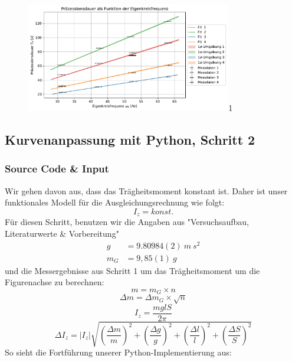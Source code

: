 \documentclass[a4paper,10pt]{article}
\begin{document}
\begin{figure}[htb]
  \centering
  \begin{annotate}{\includegraphics[width=0.8\textwidth]{213_Fig2.pdf}}{1}
  \end{annotate}
\caption{}
\label{fig:Fig2}
\end{figure}
\subsection{Kurvenanpassung mit Python, Schritt 2}
\subsubsection{Source Code \& Input}
Wir gehen davon aus, dass das Trägheitsmoment konstant ist.
Daher ist unser funktionales Modell für die Ausgleichungsrechnung wie folgt:
\begin{equation} \label{eq:Fit3}
	\boxed{I_z = konst.}
\end{equation} 
Für diesen Schritt, benutzen wir die Angaben aus "Versuchsaufbau, Literaturwerte \& Vorbereitung" 
\begin{align*}
g&=9.80984(2)\:m\:s^2\\
m_G&=9,85(1)\: g
\end{align*}
und die Messergebnisse aus Schritt 1 um das Trägheitsmoment um die Figurenachse zu berechnen:
\begin{equation} \label{eq:m}
	m={m_{G}} \times n
\end{equation} 
\begin{equation} \label{eq:Deltam}
	\Delta m= {\Delta m_{G}}\times \sqrt{n}
\end{equation} 
\begin{equation} \label{eq:I_z}
	I_z = \frac{m g l S}{2 \pi}
\end{equation} 
\begin{equation} \label{eq:DeltaI_z}
	\Delta I_z = |I_z| \sqrt{{\left( \frac{\Delta m}{m} \right)}^2+{\left( \frac{\Delta g}{g}\right)}^2+{\left(\frac{\Delta l}{l}\right)}^2+{\left( \frac{\Delta S}{S}\right )}^2}
\end{equation} 
So sieht die Fortführung unserer Python-Implementierung aus:\\
\end{document}
